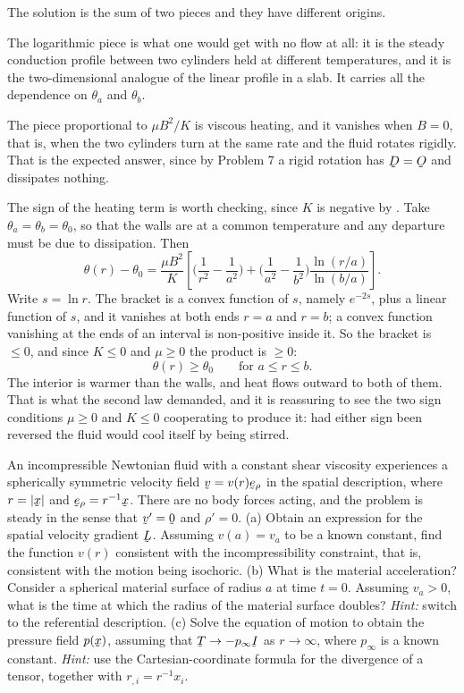 \begin{solution}
The solution is the sum of two pieces and they have different origins.

The logarithmic piece is what one would get with no flow at all: it is
the steady conduction profile between two cylinders held at different
temperatures, and it is the two-dimensional analogue of the linear
profile in a slab. It carries all the dependence on $\theta_{a}$ and
$\theta_{b}$.

The piece proportional to $\mu B^{2}/K$ is viscous heating, and it
vanishes when $B=0$, that is, when the two cylinders turn at the same
rate and the fluid rotates rigidly. That is the expected answer, since
by Problem 7 a rigid rotation has $\bD=\Ob$ and dissipates nothing.

The sign of the heating term is worth checking, since $K$ is negative
by . Take $\theta_{a}=\theta_{b}=\theta_{0}$, so that the
walls are at a common temperature and any departure must be due to
dissipation. Then
\[
   \theta(r)-\theta_{0}=\frac{\mu B^{2}}{K}
   \left[\Big(\frac{1}{r^{2}}-\frac{1}{a^{2}}\Big)
   +\Big(\frac{1}{a^{2}}-\frac{1}{b^{2}}\Big)
   \frac{\ln(r/a)}{\ln(b/a)}\right].
\]
Write $s=\ln r$. The bracket is a convex function of $s$, namely
$e^{-2s}$, plus a linear function of $s$, and it vanishes at both ends
$r=a$ and $r=b$; a convex function vanishing at the ends of an interval
is non-positive inside it. So the bracket is $\leq0$, and since
$K\leq0$ and $\mu\geq0$ the product is $\geq0$:
\[
   \theta(r)\geq\theta_{0}\qquad\text{for }a\leq r\leq b .
\]
The interior is warmer than the walls, and heat flows outward to both of
them. That is what the second law demanded, and it is reassuring to see
the two sign conditions $\mu\geq0$ and $K\leq0$ cooperating to produce
it: had either sign been reversed the fluid would cool itself by being
stirred.
\end{solution}

\begin{problem}
An incompressible Newtonian fluid with a constant shear viscosity
experiences a spherically symmetric velocity field
$\bv=v(r)\berho$ in the spatial description, where $r=|\bx|$ and
$\berho=r^{-1}\bx$. There are no body forces acting, and the problem is
steady in the sense that $\bv'=\bze$ and $\rho'=0$.
(a) Obtain an expression for the spatial velocity gradient $\bL$.
Assuming $v(a)=v_{a}$ to be a known constant, find the function $v(r)$
consistent with the incompressibility constraint, that is, consistent
with the motion being isochoric.
(b) What is the material acceleration? Consider a spherical material
surface of radius $a$ at time $t=0$. Assuming $v_{a}>0$, what is the
time at which the radius of the material surface doubles? \emph{Hint:}
switch to the referential description.
(c) Solve the equation of motion to obtain the pressure field $p(\bx)$,
assuming that $\bT\to-p_{\infty}\I$ as $r\to\infty$, where $p_{\infty}$
is a known constant. \emph{Hint:} use the Cartesian-coordinate formula
for the divergence of a tensor, together with $r_{,i}=r^{-1}x_{i}$.
\end{problem}

